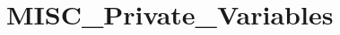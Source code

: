 \hypertarget{group___m_i_s_c___private___variables}{}\section{M\+I\+S\+C\+\_\+\+Private\+\_\+\+Variables}
\label{group___m_i_s_c___private___variables}
